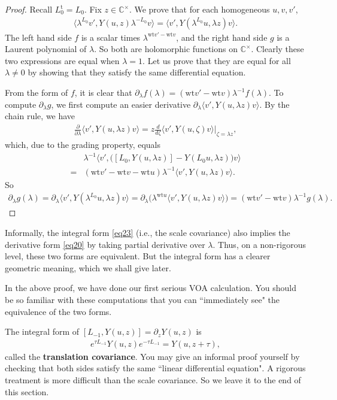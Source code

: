 \documentclass[12pt,a4paper,notitlepage]{article}
\theoremstyle{definition}
\theoremstyle{plain}
\newcommand{\tr}{\mathrm{t}} %
\newcommand{\bk}[1]{\langle {#1}\rangle}
\newcommand{\bigbk}[1]{\big\langle {#1}\big\rangle}
\newcommand{\Bigbk}[1]{\Big\langle {#1}\Big\rangle}
\newcommand{\Cbb}{\mathbb C}
\newcommand{\wt}{\mathrm{wt}}
\numberwithin{equation}{section}
\begin{document}
\begin{proof}
Recall $L_0^\tr=L_0$. Fix $z\in\Cbb^\times$. We prove that for each homogeneous $u,v,v'$,
\begin{align}
\bk{\lambda^{L_0}v',Y(u,z)\lambda^{-L_0}v}	=\bk{v',Y(\lambda^{L_0}u,\lambda z)v}.
\end{align}	
The left hand side $f$ is a scalar times $\lambda^{\wt v'-\wt v}$, and the right hand side $g$ is a Laurent polynomial of $\lambda$. So both are holomorphic functions on $\Cbb^\times$. Clearly these two expressions are equal when $\lambda=1$. Let us prove that they are equal for all $\lambda\neq 0$ by showing that they satisfy the same differential equation.

From the form of $f$, it is clear that $\partial_\lambda f(\lambda)=(\wt v'-\wt v)\lambda^{-1}f(\lambda)$. To compute $\partial_\lambda g$, we first  compute an easier derivative $\partial_\lambda\bk {v',Y(u,\lambda z)v}$. By the chain rule, we have
\begin{align*}
	\frac\partial{\partial\lambda} \bk{v',Y(u,\lambda z)v}=	z\frac d{d\zeta}\bk{v',Y(u,\zeta)v}\Big|_{\zeta=\lambda z},
\end{align*}
which, due to the grading property, equals 
\begin{align*}
&\lambda^{-1}\Bigbk{v',\big([L_0,Y(u,\lambda z)]-Y(L_0u,\lambda z)\big)v}\\
=&(\wt v'-\wt v-\wt u)\lambda^{-1}\bigbk{v',Y(u,\lambda z)v}.
\end{align*}
So
\begin{align*}
\partial_\lambda g(\lambda)=\partial_\lambda \bigbk{v',Y(\lambda^{L_0}u,\lambda z)v}=	\partial_\lambda \big(\lambda^{\wt u}\bigbk{v',Y(u,\lambda z)v}\big)=(\wt v'-\wt v)\lambda^{-1}g(\lambda).
\end{align*}
\end{proof}




Informally, the integral form \eqref{eq23} (i.e., the scale covariance) also implies the derivative form \eqref{eq20} by taking partial derivative over $\lambda$. Thus, on a non-rigorous level, these two forms are equivalent. But the integral form has a clearer geometric meaning, which we shall give later.


In the above proof, we have done our first serious VOA calculation. You should be so familiar with these computations that you can ``immediately see" the equivalence of the two forms.


The integral form of $[L_{-1},Y(u,z)]=\partial_z Y(u,z)$ is
\begin{align*}
e^{\tau L_{-1}}Y(u,z)e^{-\tau L_{-1}}=Y(u,z+\tau),
\end{align*}
called the \textbf{translation covariance}. You may give an informal proof yourself by checking that both sides satisfy the same ``linear differential equation". A rigorous treatment is more difficult than the scale covariance. So we leave it to the end of this section.
\end{document}
